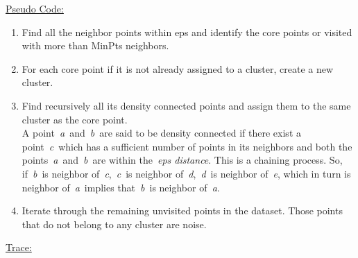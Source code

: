 \documentclass[12pt]{article}
\renewcommand{\_}{\kern-1.5pt\textunderscore\kern-1.5pt}
\begin{document}
{\fontsize{14pt}{16.8pt}\selectfont \uline{Pseudo Code:}\par}\par

\begin{enumerate}[label*=\arabic*.]
	\item Find all the neighbor points within eps and identify the core points or visited with more than MinPts neighbors.\par

	\item For each core point if it is not already assigned to a cluster, create a new cluster.\par

	\item Find recursively all its density connected points and assign them to the same cluster as the core point.\\
A point\textit{ a} and \textit{b} are said to be density connected if there exist a point \textit{c} which has a sufficient number of points in its neighbors and both the points\textit{ a} and \textit{b} are within the \textit{eps distance}. This is a chaining process. So, if \textit{b} is neighbor of \textit{c}, \textit{c} is neighbor of\textit{ d}, \textit{d} is neighbor of \textit{e}, which in turn is neighbor of \textit{a} implies that \textit{b} is neighbor of\textit{ a}.\par

	\item Iterate through the remaining unvisited points in the dataset. Those points that do not belong to any cluster are noise.
\end{enumerate}\par


\vspace{\baselineskip}

\vspace{\baselineskip}

\vspace{\baselineskip}
{\fontsize{14pt}{16.8pt}\selectfont \uline{Trace:}\par}\par



\end{document}
